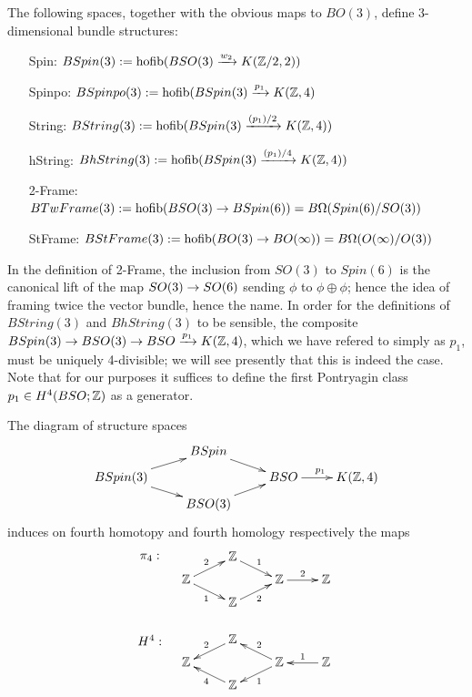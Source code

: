 \documentclass{amsart}
\begin{document}
\begin{definition}
The following spaces, together with the obvious maps to $BO(3)$, define 3-dimensional bundle structures:
\begin{itemize}
\item[Spin:] $BSpin(3) := \operatorname{hofib}(BSO(3) \xrightarrow{w_2} K(\mathbb Z/2,2))$
\item[Spinpo:] $BSpinpo(3) := \operatorname{hofib}(BSpin(3) \xrightarrow{p_1} K(\mathbb Z,4)$
\item[String:] $BString(3) := \operatorname{hofib}(BSpin(3) \xrightarrow{(p_1)/2} K(\mathbb Z,4))$
\item[hString:] $BhString(3) := \operatorname{hofib}(BSpin(3) \xrightarrow{(p_1)/4} K(\mathbb Z,4))$
\item[2-Frame:] $BTwFrame(3) := \operatorname{hofib}(BSO(3) \rightarrow BSpin(6)) = B\Omega(Spin(6)/SO(3))$
\item[StFrame:] $BStFrame(3) := \operatorname{hofib}(BO(3) \rightarrow BO(\infty)) = B\Omega(O(\infty)/O(3))$
\end{itemize}
\end{definition}

\nid In the definition of 2-Frame, the inclusion from $SO(3)$ to $Spin(6)$ is the canonical lift of the map $SO(3) \rightarrow SO(6)$ sending $\phi$ to $\phi \oplus \phi$; hence the idea of framing twice the vector bundle, hence the name.  In order for the definitions of $BString(3)$ and $BhString(3)$ to be sensible, the composite $BSpin(3) \rightarrow BSO(3) \rightarrow BSO \xrightarrow{p_1} K(\mathbb Z,4)$, which we have refered to simply as $p_1$, must be uniquely 4-divisible; we will see presently that this is indeed the case.  Note that for our purposes it suffices to define the first Pontryagin class $p_1 \in H^4(BSO;\mathbb Z)$ as a generator.

\begin{proposition} \label{prop-H4}
The diagram of structure spaces
\begin{equation} \nn
\xymatrix@R=5pt{
& BSpin \ar[dr] & & \\
BSpin(3) \ar[ur] \ar[dr] && BSO \ar[r]^{p_1} & K(\ZZ,4) \\
& BSO(3) \ar[ur] & &
}
\end{equation}
induces on fourth homotopy and fourth homology respectively the maps
\begin{equation} \nn
\xymatrix@R=5pt{
\save[]+<-1cm,0cm>*{\pi_4:}\restore & \ZZ \ar[dr]^{1} & & \\
\ZZ \ar[ur]^{2} \ar[dr]_{1} && \ZZ \ar[r]^{2} & \ZZ \\
& \ZZ \ar[ur]_{2} & & \\
&&& \\
\save[]+<-1cm,0cm>*{H^4:}\restore & \ZZ \ar[dl]_{2} & & \\
\ZZ && \ZZ \ar[ul]_{2} \ar[dl]^{1} & \ZZ \ar[l]_{1} \\
& \ZZ \ar[ul]^{4} & &
}
\end{equation}
\end{proposition}
\end{document}
